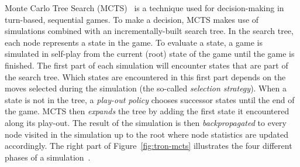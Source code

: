 \documentclass{article}
\begin{document}
Monte Carlo Tree Search (MCTS)~\cite{coulom, kocsis} is a technique used for decision-making in turn-based, 
sequential games. 
To make a decision, MCTS makes use of simulations combined with an incrementally-built search tree. 
In the search tree, each node represents a state in the game. To evaluate a state, a game is simulated in self-play from the current (root) state of the game until the game is finished. The first part of each simulation will encounter states that are part of the search tree. Which states are encountered in this first part depends on the moves selected during the simulation (the so-called {\it selection strategy}). 
When a state is not in the tree, a {\it play-out policy} chooses successor states until the end of the game.
MCTS then {\it expands} the tree by adding the first state it encountered along its play-out.
The result of the simulation is then {\it backpropagated} to every node visited in the simulation up to the root where 
node statistics are updated accordingly.
The right part of Figure~\ref{fig:tron-mcts} illustrates the four different phases of a simulation~\cite{ChaslotWHUB2008}.
\end{document}
